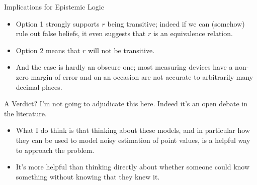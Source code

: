 \documentclass[
  14pt,
  letterpaper,
  ignorenonframetext,
  handout]{beamer}
\providecommand{\tightlist}{%
  \setlength{\itemsep}{0pt}\setlength{\parskip}{0pt}}\usepackage{longtable,booktabs,array}
\begin{document}
\begin{frame}{Implications for Epistemic Logic}
\protect\hypertarget{implications-for-epistemic-logic}{}
\begin{itemize}
\tightlist
\item
  Option 1 strongly supports \(r\) being transitive; indeed if we can
  (somehow) rule out false beliefs, it even suggests that \(r\) is an
  equivalence relation.
\item
  Option 2 means that \(r\) will not be transitive.
\item
  And the case is hardly an obscure one; most measuring devices have a
  non-zero margin of error and on an occasion are not accurate to
  arbitrarily many decimal places.
\end{itemize}
\end{frame}

\begin{frame}{A Verdict?}
\protect\hypertarget{a-verdict}{}
I'm not going to adjudicate this here. Indeed it's an open debate in the
literature.

\begin{itemize}
\tightlist
\item
  What I do think is that thinking about these models, and in particular
  how they can be used to model noisy estimation of point values, is a
  helpful way to approach the problem.
\item
  It's more helpful than thinking directly about whether someone could
  know something without knowing that they knew it.
\end{itemize}
\end{frame}
\end{document}
